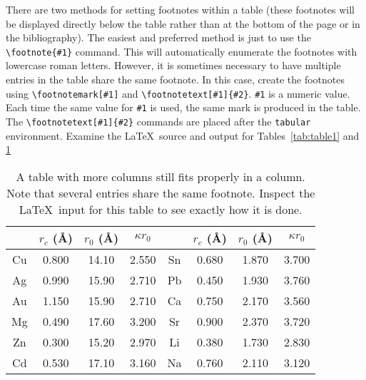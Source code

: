 \documentclass[%
 aapm,
 mph,%
 amsmath,amssymb,
preprint,%
 reprint,%
]{revtex4-2}
\begin{document}
There are two methods for setting footnotes within a table (these
footnotes will be displayed directly below the table rather than at
the bottom of the page or in the bibliography).
The easiest
and preferred method is just to use the \verb+\footnote{#1}+
command. This will automatically enumerate the footnotes with
lowercase roman letters.
However, it is sometimes necessary to have
multiple entries in the table share the same footnote.
In this case,
create the footnotes using
\verb+\footnotemark[#1]+ and \verb+\footnotetext[#1]{#2}+.
\texttt{\#1} is a numeric value.
Each time the same value for \texttt{\#1} is used,
the same mark is produced in the table.
The \verb+\footnotetext[#1]{#2}+ commands are placed after the \texttt{tabular}
environment.
Examine the \LaTeX\ source and output for Tables~\ref{tab:table1} and
\ref{tab:table2}%
\begin{table}
  \caption{\label{tab:table2}A table with more columns still fits
    properly in a column. Note that several entries share the same
    footnote. Inspect the \LaTeX\ input for this table to see
    exactly how it is done.}
  \begin{ruledtabular}
    \begin{tabular}{cccccccc}
         & $r_c$ (\AA) & $r_0$ (\AA) & $\kappa r_0$ &
         & $r_c$ (\AA) & $r_0$ (\AA) & $\kappa r_0$                              \\
      \hline
      Cu & 0.800       & 14.10       & 2.550        & Sn\footnotemark[1]
         & 0.680       & 1.870       & 3.700                                     \\
      Ag & 0.990       & 15.90       & 2.710        & Pb\footnotemark[2]
         & 0.450       & 1.930       & 3.760                                     \\
      Au & 1.150       & 15.90       & 2.710        & Ca\footnotemark[3]
         & 0.750       & 2.170       & 3.560                                     \\
      Mg & 0.490       & 17.60       & 3.200        & Sr\footnotemark[4]
         & 0.900       & 2.370       & 3.720                                     \\
      Zn & 0.300       & 15.20       & 2.970        & Li\footnotemark[2]
         & 0.380       & 1.730       & 2.830                                     \\
      Cd & 0.530       & 17.10       & 3.160        & Na\footnotemark[5]
         & 0.760       & 2.110       & 3.120                                     \\

\end{tabular}
\end{ruledtabular}
\end{table}
\end{document}
